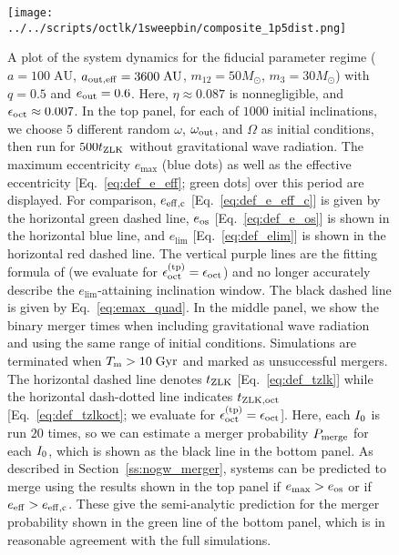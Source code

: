 \documentclass[
        fleqn,
        usenatbib,
    ]{mnras}
\newlength{\colummwidth}
\begin{document}
\begin{figure}
    \centering
    \texttt{[image: ../../scripts/octlk/1sweepbin/composite\_1p5dist.png]}
    \caption{A plot of the system dynamics for the fiducial parameter regime ($a
    = 100\;\mathrm{AU}$, $a_{\rm out, eff} = 3600\;\mathrm{AU}$, $m_{12} =
    50M_{\odot}$, $m_3 = 30M_{\odot}$) with $q = 0.5$ and $e_{\rm out} = 0.6$.
    Here, $\eta \approx 0.087$ is nonnegligible, and $\epsilon_{\rm oct} \approx
    0.007$. In the top panel, for each of $1000$ initial inclinations, we choose
    $5$ different random $\omega$, $\omega_{\rm out}$, and $\Omega$ as initial
    conditions, then run for $500t_{\rm ZLK}$ without gravitational wave
    radiation. The maximum eccentricity $e_{\max}$ (blue dots) as well as the
    effective eccentricity [Eq.~\eqref{eq:def_e_eff}; green dots] over this
    period are displayed. For comparison, $e_{\rm eff, c}$
    [Eq.~\eqref{eq:def_e_eff_c}] is given by the horizontal green dashed line,
    $e_{\rm os}$ [Eq.~\eqref{eq:def_e_os}] is shown in the horizontal blue line,
    and $e_{\lim}$ [Eq.~\eqref{eq:def_elim}] is shown in the horizontal red
    dashed line. The vertical purple lines are the fitting formula of
    \citet{MLL16} (we evaluate for $\epsilon_{\rm oct}^{\rm (tp)} =
    \epsilon_{\rm oct}$) and no longer accurately describe the
    $e_{\lim}$-attaining inclination window. The black dashed line is given by
    Eq.~\eqref{eq:emax_quad}. In the middle panel, we show the binary merger
    times when including gravitational wave radiation and using the same range
    of initial conditions. Simulations are terminated when $T_{\rm m} >
    10\;\mathrm{Gyr}$ and marked as unsuccessful mergers. The horizontal dashed
    line denotes $t_{\rm ZLK}$ [Eq.~\eqref{eq:def_tzlk}] while the horizontal
    dash-dotted line indicates $t_{\rm ZLK, oct}$ [Eq.~\eqref{eq:def_tzlkoct};
    we evaluate for $\epsilon_{\rm oct}^{\rm (tp)} = \epsilon_{\rm oct}$]. Here,
    each $I_{\rm 0}$ is run $20$ times, so we can estimate a merger probability
    $P_{\rm merge}$ for each $I_{\rm 0}$, which is shown as the black line in
    the bottom panel. As described in Section~\ref{ss:nogw_merger}, systems can
    be predicted to merge using the results shown in the top panel if $e_{\max}
    > e_{\rm os}$ or if $e_{\rm eff} > e_{\rm eff, c}$. These give the
    semi-analytic prediction for the merger probability shown in the green line
    of the bottom panel, which is in reasonable agreement with the full
    simulations. }\label{fig:composite_dist}
\end{figure}
\end{document}

